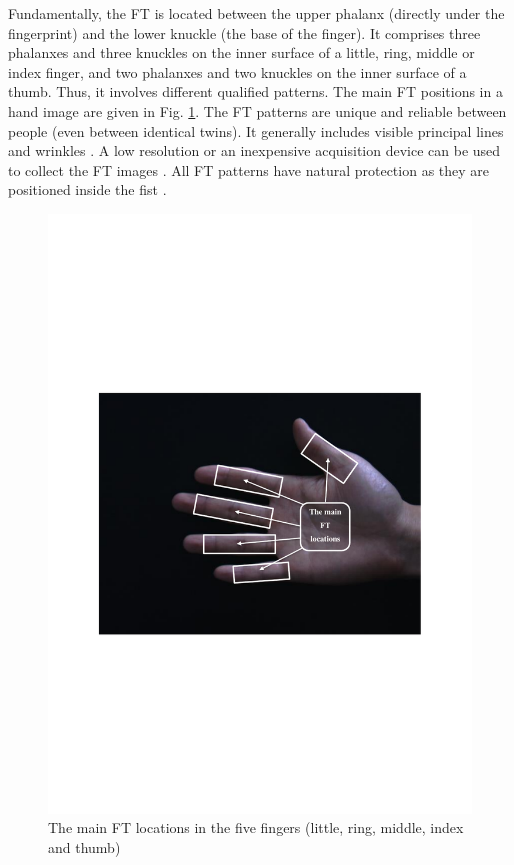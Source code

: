 \documentclass[conference]{IEEEtran}
\begin{document}
Fundamentally, the FT is located between the upper phalanx (directly under the fingerprint) and the lower knuckle (the base of the finger). It comprises three phalanxes and three knuckles on the inner surface of a little, ring, middle or index finger, and two phalanxes and two knuckles on the inner surface of a thumb. Thus, it involves different qualified patterns. The main FT positions in a hand image are given in Fig. \ref{fig:FT_locations}. 
%
The FT patterns are unique and reliable between people (even between identical twins). It generally includes visible principal lines and wrinkles \cite{Bhaskar2014Hand}. A low resolution or an inexpensive acquisition device can be used to collect the FT images \cite{Michael2010Robust}. All FT patterns have natural protection as they are positioned inside the fist \cite{Al-Nima2015Human}. 
\begin{figure}[!h]
    \centering
    \includegraphics[page=1,scale=.5,trim=3cm 9cm 3cm 9cm,clip]{FT_locations_patterns.pdf}
    \caption{The main FT locations in the five fingers (little, ring, middle, index and thumb)}
    \label{fig:FT_locations}
\end{figure}
\end{document}
